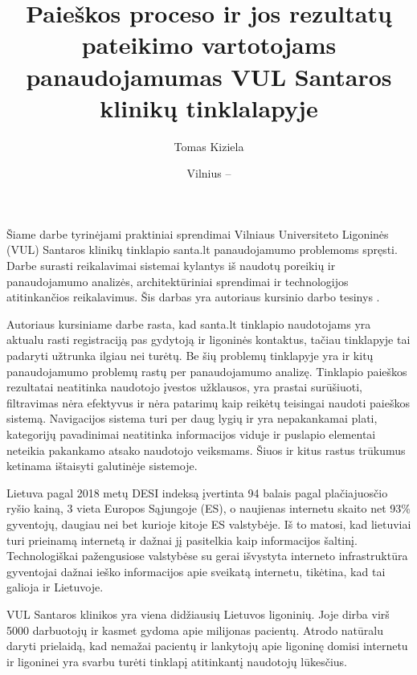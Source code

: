 \documentclass{VUMIFPSkursinis}
\title{Paieškos proceso ir jos rezultatų pateikimo vartotojams panaudojamumas VUL Santaros klinikų tinklalapyje}
\author{Tomas Kiziela}
\date{Vilnius – \the\year}
\begin{document}
	
\maketitle
\cleardoublepage{}
\setcounter{page}{2}

\tableofcontents



Šiame darbe tyrinėjami praktiniai sprendimai Vilniaus Universiteto Ligoninės (VUL) Santaros klinikų tinklapio santa.lt panaudojamumo problemoms spręsti. Darbe surasti reikalavimai sistemai kylantys iš naudotų poreikių ir panaudojamumo analizės, architektūriniai sprendimai ir technologijos atitinkančios reikalavimus. Šis darbas yra autoriaus kursinio darbo tesinys \cite{Kursinis}.

Autoriaus kursiniame darbe rasta, kad santa.lt tinklapio naudotojams yra aktualu rasti registraciją pas gydytoją ir ligoninės kontaktus, tačiau tinklapyje tai padaryti užtrunka ilgiau nei turėtų. Be šių problemų tinklapyje yra ir kitų panaudojamumo problemų rastų per panaudojamumo analizę. Tinklapio paieškos rezultatai neatitinka naudotojo įvestos užklausos, yra prastai surūšiuoti, filtravimas nėra efektyvus ir nėra patarimų kaip reikėtų teisingai naudoti paieškos sistemą. Navigacijos sistema turi per daug lygių ir yra nepakankamai plati, kategorijų pavadinimai neatitinka informacijos viduje ir puslapio elementai neteikia pakankamo atsako naudotojo veiksmams. Šiuos ir kitus rastus trūkumus ketinama ištaisyti galutinėje sistemoje.

Lietuva pagal 2018 metų DESI indeksą įvertinta 94 balais pagal plačiajuosčio ryšio kainą, 3 vieta Europos Sąjungoje (ES), o naujienas internetu skaito net 93\% gyventojų, daugiau nei bet kurioje kitoje ES valstybėje\cite{InternetasLt}. Iš to matosi, kad lietuviai turi prieinamą internetą ir dažnai jį pasitelkia kaip informacijos šaltinį. Technologiškai pažengusiose valstybėse su gerai išvystyta interneto infrastruktūra gyventojai dažnai ieško informacijos apie sveikatą internetu\cite{InternetUseByPublicSAEn}\cite{InternetUseByPublicHKEn}, tikėtina, kad tai galioja ir Lietuvoje.

VUL Santaros klinikos yra viena didžiausių Lietuvos ligoninių. Joje dirba virš 5000 darbuotojų ir kasmet gydoma apie milijonas pacientų\cite{VulSkApieMusLt}. Atrodo natūralu daryti prielaidą, kad nemažai pacientų ir lankytojų apie ligoninę domisi internetu ir ligoninei yra svarbu turėti tinklapį atitinkantį naudotojų lūkesčius.
\end{document}
